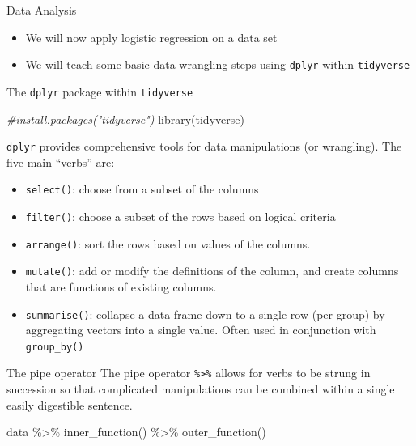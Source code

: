 \documentclass[
  ignorenonframetext,
]{beamer}
\newenvironment{Shaded}{\begin{snugshade}}{\end{snugshade}}
\newcommand{\CommentTok}[1]{\textcolor[rgb]{0.56,0.35,0.01}{\textit{#1}}}
\newcommand{\FunctionTok}[1]{\textcolor[rgb]{0.00,0.00,0.00}{#1}}
\newcommand{\NormalTok}[1]{#1}
\newcommand{\SpecialCharTok}[1]{\textcolor[rgb]{0.00,0.00,0.00}{#1}}
\providecommand{\tightlist}{%
  \setlength{\itemsep}{0pt}\setlength{\parskip}{0pt}}
\begin{document}
\begin{frame}{Data Analysis}
\protect\hypertarget{data-analysis}{}
\begin{itemize}
\tightlist
\item
  We will now apply logistic regression on a data set
\item
  We will teach some basic data wrangling steps using \texttt{dplyr}
  within \texttt{tidyverse}
\end{itemize}
\end{frame}

\begin{frame}[fragile]{The \texttt{dplyr} package within
\texttt{tidyverse}}
\protect\hypertarget{the-package-within}{}
\begin{Shaded}
\begin{Highlighting}[]
\CommentTok{\#install.packages("tidyverse")}
\FunctionTok{library}\NormalTok{(tidyverse)}
\end{Highlighting}
\end{Shaded}

\texttt{dplyr} provides comprehensive tools for data manipulations (or
wrangling). The five main ``verbs'' are:

\begin{itemize}
\item
  \texttt{select()}: choose from a subset of the columns
\item
  \texttt{filter()}: choose a subset of the rows based on logical
  criteria
\item
  \texttt{arrange()}: sort the rows based on values of the columns.
\item
  \texttt{mutate()}: add or modify the definitions of the column, and
  create columns that are functions of existing columns.
\item
  \texttt{summarise()}: collapse a data frame down to a single row (per
  group) by aggregating vectors into a single value. Often used in
  conjunction with \texttt{group\_by()}
\end{itemize}
\end{frame}

\begin{frame}[fragile]{The pipe operator}
\protect\hypertarget{the-pipe-operator}{}
The pipe operator \texttt{\%>\%} allows for verbs to be strung in
succession so that complicated manipulations can be combined within a
single easily digestible sentence.

\vspace{12pt}

\begin{Shaded}
\begin{Highlighting}[]
\NormalTok{data }\SpecialCharTok{\%\textgreater{}\%} 
    \FunctionTok{inner\_function}\NormalTok{() }\SpecialCharTok{\%\textgreater{}\%} 
    \FunctionTok{outer\_function}\NormalTok{()}
\end{Highlighting}
\end{Shaded}
\end{frame}
\end{document}
